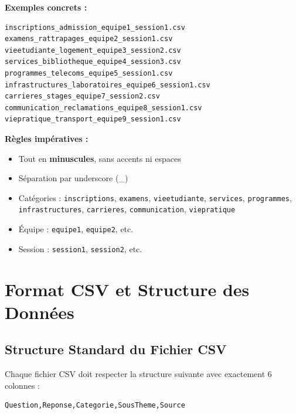 \documentclass[11pt,a4paper]{article}
\begin{document}
\textbf{Exemples concrets :}
\begin{lstlisting}
inscriptions_admission_equipe1_session1.csv
examens_rattrapages_equipe2_session1.csv
vieetudiante_logement_equipe3_session2.csv
services_bibliotheque_equipe4_session3.csv
programmes_telecoms_equipe5_session1.csv
infrastructures_laboratoires_equipe6_session1.csv
carrieres_stages_equipe7_session2.csv
communication_reclamations_equipe8_session1.csv
viepratique_transport_equipe9_session1.csv
\end{lstlisting}

\textbf{Règles impératives :}
\begin{itemize}
    \item Tout en \textbf{minuscules}, sans accents ni espaces
    \item Séparation par underscore (\_)
    \item Catégories : \texttt{inscriptions}, \texttt{examens}, \texttt{vieetudiante}, \texttt{services}, \texttt{programmes}, \texttt{infrastructures}, \texttt{carrieres}, \texttt{communication}, \texttt{viepratique}
    \item Équipe : \texttt{equipe1}, \texttt{equipe2}, etc.
    \item Session : \texttt{session1}, \texttt{session2}, etc.
\end{itemize}

\section{Format CSV et Structure des Données}
\label{sec:csv-format}

\subsection{Structure Standard du Fichier CSV}
Chaque fichier CSV doit respecter la structure suivante avec exactement 6 colonnes :

\begin{lstlisting}[caption=Structure CSV standard]
Question,Reponse,Categorie,SousTheme,Source
\end{lstlisting}
\end{document}
